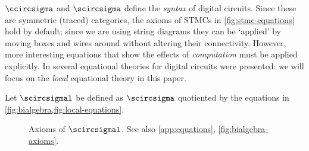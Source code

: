 \(\ccircsigma\) and \(\scircsigma\) define the \emph{syntax} of digital
circuits.
Since these are symmetric (traced) categories, the axioms of STMCs in
\cref{fig:stmc-equations} hold by default; since we are using string diagrams
they can be `applied' by moving boxes and wires around without altering their
connectivity.
However, more interesting equations that show the effects of \emph{computation}
must be applied explicitly.
In \cite{ghica2022compositional} several equational theories for digital
circuits were presented: we will focus on the \emph{local} equational theory
in this paper.

\begin{definition}
    Let \(\scircsigmal\) be defined as \(\scircsigma\) quotiented by the
    equations in \cref{fig:bialgebra,fig:local-equations}.
\end{definition}

\begin{figure*}
    \centering
    \combinationalequationslist
    \begin{minipage}[b]{0.215\textwidth}
        \forkgateeqn
    \end{minipage}
    \hspace{-0.6em}
    \begin{minipage}[b]{0.174\textwidth}
        \stubgateeqn
    \end{minipage}
    \hspace{-0.6em}
    \begin{minipage}[b]{0.171\textwidth}
        \stubdelayeqn
    \end{minipage}
    \hspace{-0.6em}
    \begin{minipage}[b]{0.164\textwidth}
        \forkjoininverseeqn
    \end{minipage}
    \hspace{-0.6em}
    \begin{minipage}[b]{0.2714\textwidth}
        \streamingeqn
    \end{minipage}
    \begin{minipage}[b]{0.16\textwidth}
        \disconnecteqn
    \end{minipage}
    \begin{minipage}[b]{0.2\textwidth}
        \forkdelayeqn
    \end{minipage}
    \begin{minipage}[b]{0.2\textwidth}
        \joindelayeqn
    \end{minipage}
    \begin{minipage}[b]{0.19\textwidth}
        \instantfeedbackeqn
    \end{minipage}
    \begin{minipage}[b]{0.21\textwidth}
        \delaydiscardeqn
    \end{minipage}
    \caption{
        Axioms of \(\scircsigmal\).
        See also \cref{app:equations}, \cref{fig:bialgebra-axioms}.
    }
    \label{fig:local-equations}
\end{figure*}

